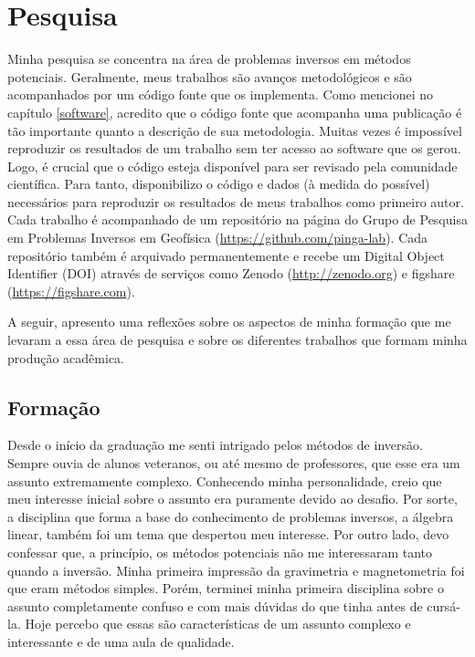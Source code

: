 \section{Pesquisa}

Minha pesquisa se concentra na área de problemas inversos em métodos
potenciais.
Geralmente, meus trabalhos são avanços metodológicos e são acompanhados por
um código fonte que os implementa.
Como mencionei no capítulo \ref{software}, acredito que o código fonte que
acompanha uma publicação é tão importante quanto a descrição de sua
metodologia.
Muitas vezes é impossível reproduzir os resultados de um trabalho
sem ter acesso ao software que os gerou.
Logo, é crucial que o código esteja disponível para ser revisado pela
comunidade científica.
Para tanto, disponibilizo o código e dados (à medida do possível) necessários
para reproduzir os resultados de meus trabalhos como primeiro autor.
Cada trabalho é acompanhado de um repositório na página do Grupo de Pesquisa em
Problemas Inversos em Geofísica (\url{https://github.com/pinga-lab}).
Cada repositório também é arquivado permanentemente e recebe um Digital Object
Identifier (DOI) através de serviços como Zenodo (\url{http://zenodo.org}) e
figshare (\url{https://figshare.com}).

A seguir, apresento uma reflexões sobre os aspectos de minha formação que me
levaram a essa área de pesquisa e sobre os diferentes trabalhos que formam
minha produção acadêmica.


\subsection{Formação}

Desde o início da graduação me senti intrigado pelos métodos de inversão.
Sempre ouvia de alunos veteranos, ou até mesmo de professores, que esse era um
assunto extremamente complexo.
Conhecendo minha personalidade, creio que meu interesse inicial sobre o assunto
era puramente devido ao desafio.
Por sorte, a disciplina que forma a base do conhecimento de problemas inversos,
a álgebra linear, também foi um tema que despertou meu interesse.
Por outro lado, devo confessar que, a princípio, os métodos potenciais não me
interessaram tanto quando a inversão.
Minha primeira impressão da gravimetria e magnetometria foi que eram métodos
simples.
Porém, terminei minha primeira disciplina sobre o assunto completamente confuso
e com mais dúvidas do que tinha antes de cursá-la.
Hoje percebo que essas são características de um assunto complexo e
interessante e de uma aula de qualidade.

